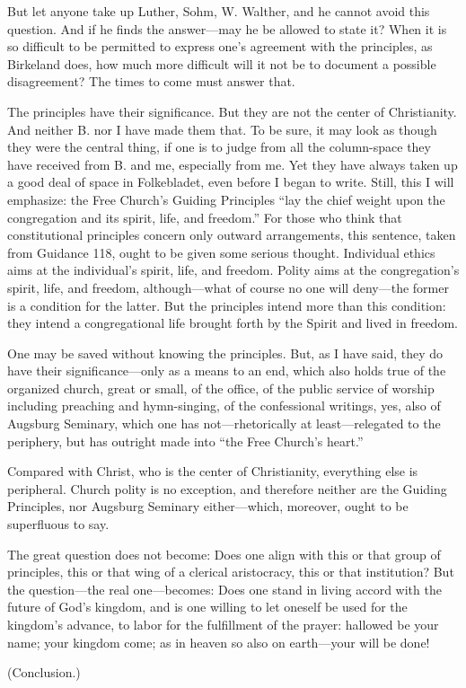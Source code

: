 But let anyone take up Luther, Sohm, W. Walther, and he cannot avoid this question. And if he finds the answer—may he be allowed to state it? When it is so difficult to be permitted to express one’s agreement with the principles, as Birkeland does, how much more difficult will it not be to document a possible disagreement? The times to come must answer that.

The principles have their significance. But they are not the center of Christianity. And neither B. nor I have made them that. To be sure, it may look as though they were the central thing, if one is to judge from all the column-space they have received from B. and me, especially from me. Yet they have always taken up a good deal of space in Folkebladet, even before I began to write. Still, this I will emphasize: the Free Church’s Guiding Principles “lay the chief weight upon the congregation and its spirit, life, and freedom.” For those who think that constitutional principles concern only outward arrangements, this sentence, taken from Guidance 118, ought to be given some serious thought. Individual ethics aims at the individual’s spirit, life, and freedom. Polity aims at the congregation’s spirit, life, and freedom, although—what of course no one will deny—the former is a condition for the latter. But the principles intend more than this condition: they intend a congregational life brought forth by the Spirit and lived in freedom.

One may be saved without knowing the principles. But, as I have said, they do have their significance—only as a means to an end, which also holds true of the organized church, great or small, of the office, of the public service of worship including preaching and hymn-singing, of the confessional writings, yes, also of Augsburg Seminary, which one has not—rhetorically at least—relegated to the periphery, but has outright made into “the Free Church’s heart.”

Compared with Christ, who is the center of Christianity, everything else is peripheral. Church polity is no exception, and therefore neither are the Guiding Principles, nor Augsburg Seminary either—which, moreover, ought to be superfluous to say.

The great question does not become: Does one align with this or that group of principles, this or that wing of a clerical aristocracy, this or that institution? But the question—the real one—becomes: Does one stand in living accord with the future of God’s kingdom, and is one willing to let oneself be used for the kingdom’s advance, to labor for the fulfillment of the prayer: hallowed be your name; your kingdom come; as in heaven so also on earth—your will be done!

(Conclusion.)
